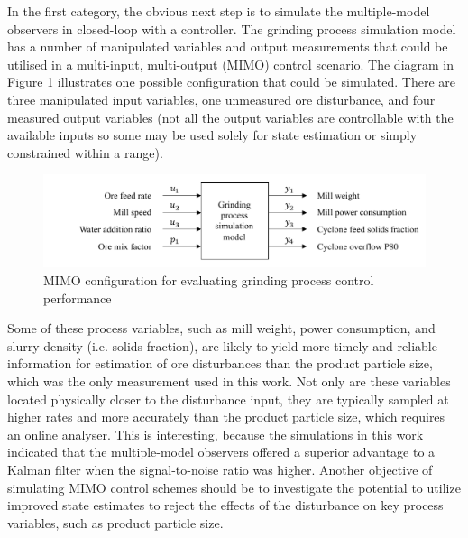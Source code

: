 In the first category, the obvious next step is to simulate the multiple-model observers in closed-loop with a controller. The grinding process simulation model has a number of manipulated variables and output measurements that could be utilised in a multi-input, multi-output (\acrshort{MIMO}) control scenario. The diagram in Figure \ref{fig:grind_sim_io_diag} illustrates one possible configuration that could be simulated. There are three manipulated input variables, one unmeasured ore disturbance, and four measured output variables (not all the output variables are controllable with the available inputs so some may be used solely for state estimation or simply constrained within a range).
\begin{figure}[ht]
	\centering
	\includegraphics[width=15cm]{images/grind_sim_io_diag.pdf}
	\caption{\acrshort{MIMO} configuration for evaluating grinding process control performance}
	\label{fig:grind_sim_io_diag}
\end{figure}
Some of these process variables, such as mill weight, power consumption, and slurry density (i.e. solids fraction), are likely to yield more timely and reliable information for estimation of ore disturbances than the product particle size, which was the only measurement used in this work. Not only are these variables located physically closer to the disturbance input, they are typically sampled at higher rates and more accurately than the product particle size, which requires an online analyser. This is interesting, because the simulations in this work indicated that the multiple-model observers offered a superior advantage to a Kalman filter when the signal-to-noise ratio was higher. Another objective of simulating \gls{MIMO} control schemes should be to investigate the potential to utilize improved state estimates to reject the effects of the disturbance on key process variables, such as product particle size.

